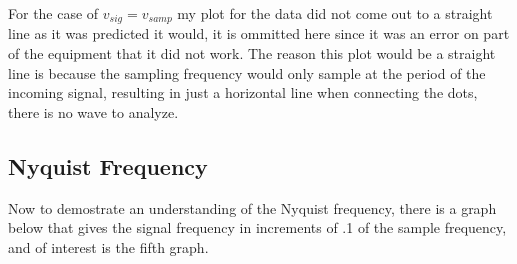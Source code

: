 \documentclass[12 pt]{article}
\begin{document}
For the case of $v_{sig} = v_{samp}$ my plot for the data did not come
out to a straight line as it was predicted it would, it is ommitted here
since it was an error on part of the equipment that it did not work. The
reason this plot would be a straight line is because the sampling
frequency would only sample at the period of the incoming signal,
resulting in just a horizontal line when connecting the dots, there is
no wave to analyze. 
\subsection{Nyquist Frequency}

Now to demostrate an understanding of the Nyquist frequency, there is a
graph below that gives the signal frequency in increments of .1 of the
sample frequency, and of interest is the fifth graph.
\end{document}
